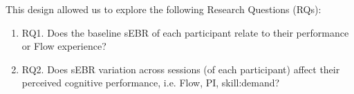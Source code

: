 \documentclass[10pt,letterpaper,floatsintext]{article}
\begin{document}

%
%
%
%


This design allowed us to explore the following Research Questions (RQs):

\begin{enumerate}
	\item RQ1. Does the baseline sEBR of each participant relate to their performance or Flow experience?

	\item RQ2. Does sEBR variation across sessions (of each participant) affect their perceived cognitive performance, i.e. Flow, PI, skill:demand?


\end{enumerate}
\end{document}
